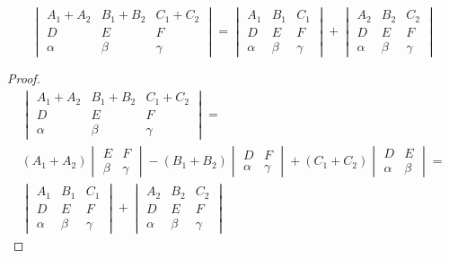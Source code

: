 \documentclass[main]{subfiles}
\begin{document}
\begin{lemma}
    \[\begin{vmatrix}
            A_1 + A_2 & B_1 + B_2 & C_1 + C_2 \\
            D         & E         & F         \\
            \alpha    & \beta     & \gamma
        \end{vmatrix} =
        \begin{vmatrix}
            A_1    & B_1   & C_1    \\
            D      & E     & F      \\
            \alpha & \beta & \gamma
        \end{vmatrix} +
        \begin{vmatrix}
            A_2    & B_2   & C_2    \\
            D      & E     & F      \\
            \alpha & \beta & \gamma
        \end{vmatrix}\]
\end{lemma}
\begin{proof}
    \begin{multline*}
        \begin{vmatrix}
            A_1 + A_2 & B_1 + B_2 & C_1 + C_2 \\
            D         & E         & F         \\
            \alpha    & \beta     & \gamma
        \end{vmatrix} =\\
        (A_1 + A_2) \begin{vmatrix}
            E     & F      \\
            \beta & \gamma
        \end{vmatrix}
        - (B_1 + B_2) \begin{vmatrix}
            D      & F      \\
            \alpha & \gamma
        \end{vmatrix}
        + (C_1 + C_2) \begin{vmatrix}
            D      & E     \\
            \alpha & \beta
        \end{vmatrix}=\\
        \begin{vmatrix}
            A_1    & B_1   & C_1    \\
            D      & E     & F      \\
            \alpha & \beta & \gamma
        \end{vmatrix} +
        \begin{vmatrix}
            A_2    & B_2   & C_2    \\
            D      & E     & F      \\
            \alpha & \beta & \gamma
        \end{vmatrix}
    \end{multline*}
\end{proof}
\end{document}
